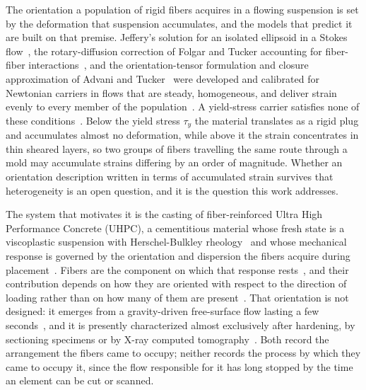 \documentclass[%
  aip,
  pof,          %
  reprint,      %
  floatfix
]{revtex4-2}
\begin{document}
The orientation a population of rigid fibers acquires in a flowing suspension is set by the deformation that suspension accumulates, and the models that predict it are built on that premise. Jeffery's solution for an isolated ellipsoid in a Stokes flow~\cite{jeffery1922motion}, the rotary-diffusion correction of Folgar and Tucker accounting for fiber-fiber interactions~\cite{folgar1984orientation}, and the orientation-tensor formulation and closure approximation of Advani and Tucker~\cite{advani1987use} were developed and calibrated for Newtonian carriers in flows that are steady, homogeneous, and deliver strain evenly to every member of the population~\cite{eberle2010kinetics,cieslinski2016fiber,egelmeers2025situ}. A yield-stress carrier satisfies none of these conditions~\cite{balmforth2014yielding,bonn2017yield}. Below the yield stress $\tau_y$ the material translates as a rigid plug and accumulates almost no deformation, while above it the strain concentrates in thin sheared layers, so two groups of fibers travelling the same route through a mold may accumulate strains differing by an order of magnitude. Whether an orientation description written in terms of accumulated strain survives that heterogeneity is an open question, and it is the question this work addresses.

The system that motivates it is the casting of fiber-reinforced Ultra High Performance Concrete (UHPC), a cementitious material whose fresh state is a viscoplastic suspension with Herschel-Bulkley rheology~\cite{delarrard1998fresh,roussel2006thixotropy} and whose mechanical response is governed by the orientation and dispersion the fibers acquire during placement~\cite{kang2011tensile,abrishambaf2017influence}. Fibers are the component on which that response rests~\cite{shi2024ultra,wille2011ultra}, and their contribution depends on how they are oriented with respect to the direction of loading rather than on how many of them are present~\cite{kang2010tensile,ferrara2011method}. That orientation is not designed: it emerges from a gravity-driven free-surface flow lasting a few seconds~\cite{zhou2017fiber}, and it is presently characterized almost exclusively after hardening, by sectioning specimens or by X-ray computed tomography~\cite{zhang2021synthesis,konrad2025analysis}. Both record the arrangement the fibers came to occupy; neither records the process by which they came to occupy it, since the flow responsible for it has long stopped by the time an element can be cut or scanned.
\end{document}
